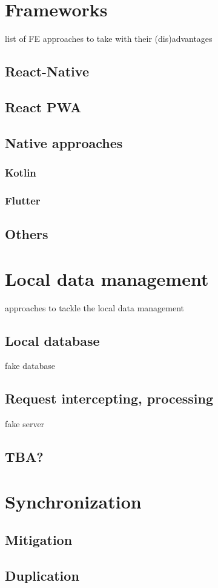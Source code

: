 \documentclass[
  digital,     %
  color,       %
  oneside,     %
  nosansbold,  %
  nocolorbold, %
  lof,         %
  lot,         %
]{fithesis4}
\begin{document}
\section{Frameworks}
list of FE approaches to take with their (dis)advantages
\subsection{React-Native}
\subsection{React PWA}
\subsection{Native approaches}
\subsubsection{Kotlin}
\subsubsection{Flutter}
\subsection{Others}
\section{Local data management}
approaches to tackle the local data management
\subsection{Local database}
fake database
\subsection{Request intercepting, processing}
fake server
\subsection{TBA?}
\section{Synchronization}
\subsection{Mitigation}
\subsection{Duplication}
\end{document}
